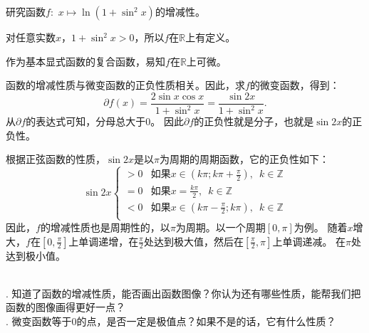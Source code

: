 \documentclass[12pt,UTF8]{ctexbook}
\begin{document}
\begin{et}
    研究函数$f:\,\,x\mapsto \ln(1 + \sin^2{x})$的增减性。
\end{et}

\begin{so}
    对任意实数$x$，$1 + \sin^2{x} > 0$，所以$f$在$\mathbb{R}$上有定义。

    作为基本显式函数的复合函数，易知$f$在$\mathbb{R}$上可微。

    函数的增减性质与微变函数的正负性质相关。因此，求$f$的微变函数，得到：
    $$ \partial f(x) = \frac{2\sin{x}\cos{x}}{1 + \sin^2{x}} = \frac{\sin{2x}}{1 + \sin^2{x}}.$$
    从$ \partial f $的表达式可知，分母总大于$0$。
    因此$ \partial f $的正负性就是分子，也就是$\sin{2x}$的正负性。

    根据正弦函数的性质，$\sin{2x}$是以$\pi$为周期的周期函数，它的正负性如下：
    $$ \sin{2x} \left\{
        \begin{array}{cl}
            > 0 & \mbox{如果}x \in (k\pi; k\pi + \frac{\pi}{2}),\,\,\, k\in\mathbb{Z} \\
            = 0 & \mbox{如果}x = \frac{k\pi}{2}, \,\,\,k\in\mathbb{Z} \\
            < 0 & \mbox{如果}x \in (k\pi - \frac{\pi}{2}; k\pi), \,\,\,k\in\mathbb{Z} \\
        \end{array}\right.
    $$
    因此，$f$的增减性质也是周期性的，以$\pi$为周期。以一个周期$[0, \pi]$为例。
    随着$x$增大，$f$在$[0, \frac{\pi}{2}]$上单调递增，在$\frac{\pi}{2}$处达到极大值，然后在$[\frac{\pi}{2}, \pi]$上单调递减。
    在$\pi$处达到极小值。
    
\end{so}

\begin{sk}
    \mbox{} \\
    . 知道了函数的增减性质，能否画出函数图像？你认为还有哪些性质，能帮我们把函数的图像画得更好一点？\\
    . 微变函数等于$0$的点，是否一定是极值点？如果不是的话，它有什么性质？    
\end{sk}
\end{document}
